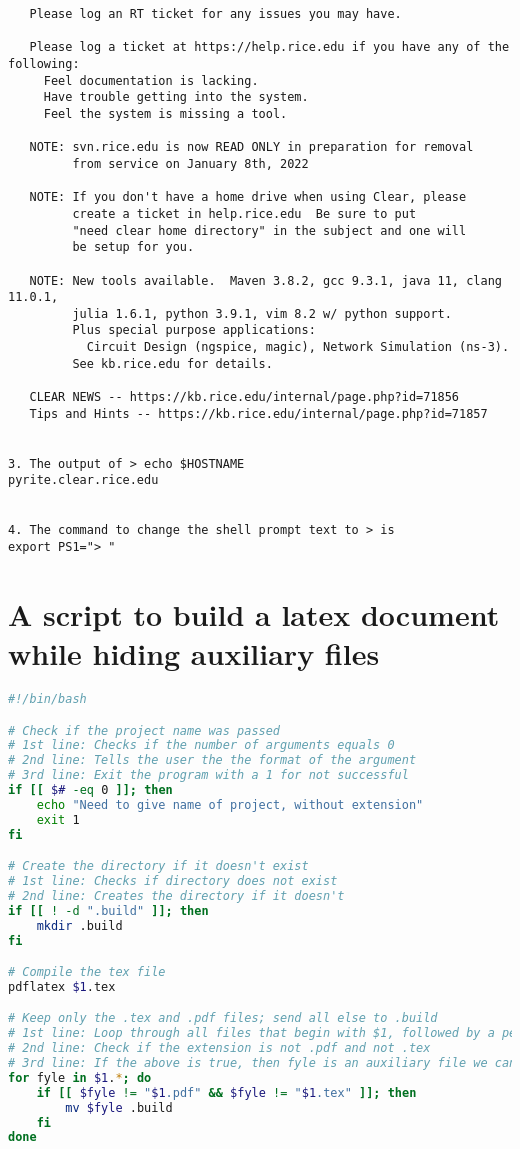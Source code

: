 \documentclass[12 pt]{article}
\begin{document}
\begin{verbatim}
   Please log an RT ticket for any issues you may have.
 
   Please log a ticket at https://help.rice.edu if you have any of the following:
     Feel documentation is lacking.
     Have trouble getting into the system.
     Feel the system is missing a tool.
 
   NOTE: svn.rice.edu is now READ ONLY in preparation for removal 
         from service on January 8th, 2022
 
   NOTE: If you don't have a home drive when using Clear, please 
         create a ticket in help.rice.edu  Be sure to put 
         "need clear home directory" in the subject and one will 
         be setup for you.
 
   NOTE: New tools available.  Maven 3.8.2, gcc 9.3.1, java 11, clang 11.0.1,
         julia 1.6.1, python 3.9.1, vim 8.2 w/ python support.  
         Plus special purpose applications: 
           Circuit Design (ngspice, magic), Network Simulation (ns-3).
         See kb.rice.edu for details.
 
   CLEAR NEWS -- https://kb.rice.edu/internal/page.php?id=71856
   Tips and Hints -- https://kb.rice.edu/internal/page.php?id=71857


3. The output of > echo $HOSTNAME
pyrite.clear.rice.edu


4. The command to change the shell prompt text to > is
export PS1="> "
\end{verbatim}

\section{A script to build a latex document while hiding auxiliary files}

\begin{lstlisting}[language=bash,basicstyle=\ttfamily, caption={Contents of clean-build.sh}]
#!/bin/bash

# Check if the project name was passed
# 1st line: Checks if the number of arguments equals 0
# 2nd line: Tells the user the the format of the argument
# 3rd line: Exit the program with a 1 for not successful 
if [[ $# -eq 0 ]]; then
	echo "Need to give name of project, without extension"
	exit 1
fi

# Create the directory if it doesn't exist
# 1st line: Checks if directory does not exist
# 2nd line: Creates the directory if it doesn't
if [[ ! -d ".build" ]]; then
	mkdir .build
fi

# Compile the tex file
pdflatex $1.tex

# Keep only the .tex and .pdf files; send all else to .build
# 1st line: Loop through all files that begin with $1, followed by a period, then any extension. These files are the only ones of interest
# 2nd line: Check if the extension is not .pdf and not .tex
# 3rd line: If the above is true, then fyle is an auxiliary file we can send to .build
for fyle in $1.*; do
	if [[ $fyle != "$1.pdf" && $fyle != "$1.tex" ]]; then
		mv $fyle .build
	fi
done

\end{lstlisting}
\end{document}
